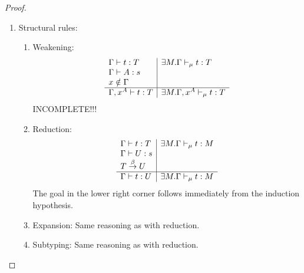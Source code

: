 \begin{theorem}
\begin{proof}
\begin{enumerate}
\begin{enumerate}
            \end{enumerate}

            \item Structural rules:
            \begin{enumerate}
                \item Weakening:
                $$
                \begin{array}{l|l}
                    \Gamma \vdash t: T
                    & \exists M. \Gamma \vdash_\mu t: T
                    \\
                    \Gamma \vdash A: s
                    \\
                    x \notin \Gamma
                    \\
                    \hline
                    \Gamma, x^A \vdash t : T
                    &
                    \exists M. \Gamma, x^A \vdash_\mu t: T
                \end{array}
                $$
                    INCOMPLETE!!!

                \item Reduction:
                $$
                \begin{array}{l|l}
                    \Gamma \vdash t : T
                    &
                    \exists M. \Gamma \vdash_\mu t: M
                    \\
                    \Gamma \vdash U : s
                    \\
                    T \stackrel{\beta}{\to} U
                    \\
                    \hline
                    \Gamma \vdash t : U
                    &
                    \exists M. \Gamma \vdash_\mu t: M
                \end{array}
                $$
                The goal in the lower right corner follows immediately from the
                    induction hypothesis.

                \item Expansion: Same reasoning as with reduction.

                \item Subtyping: Same reasoning as with reduction.

            \end{enumerate}
        \end{enumerate}
    \end{proof}
\end{theorem}



